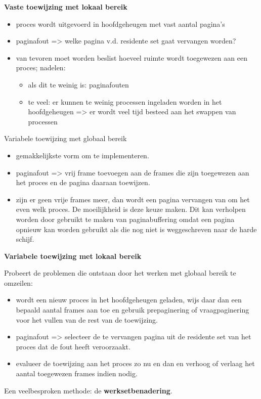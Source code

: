 \textbf{Vaste toewijzing met lokaal bereik}

\begin{itemize}
    \item proces wordt uitgevoerd in hoofdgeheugen met vast aantal pagina's
    \item paginafout => welke pagina v.d. residente set gaat vervangen worden?
    \item van tevoren moet worden beslist hoeveel ruimte wordt toegewezen aan een proces; nadelen:
        \begin{itemize}
        \item als dit te weinig is: paginafouten
        \item te veel: er kunnen te weinig processen ingeladen worden in het hoofdgeheugen => er wordt veel tijd besteed aan het swappen van processen
        \end{itemize}
\end{itemize}

Variabele toewijzing met globaal bereik

\begin{itemize}
\item gemakkelijkste vorm om te implementeren.
\item paginafout => vrij frame toevoegen aan de frames die zijn toegewezen aan het proces en de pagina daaraan toewijzen.
\item zijn er geen vrije frames meer, dan wordt een pagina vervangen van om het even welk proces. De moeilijkheid is deze keuze maken. Dit kan verholpen worden door gebruikt te maken van paginabuffering omdat een pagina opnieuw kan worden gebruikt als die nog niet is weggeschreven naar de harde schijf.
\end{itemize}




\textbf{Variabele toewijzing met lokaal bereik}

Probeert de problemen die ontstaan door het werken met globaal bereik te omzeilen:

\begin{itemize}
\item wordt een nieuw proces in het hoofdgeheugen geladen, wijs daar dan een bepaald aantal frames aan toe en gebruik prepaginering of vraagpaginering voor het vullen van de rest van de toewijzing.
\item paginafout => selecteer de te vervangen pagina uit de residente set van het proces dat de fout heeft veroorzaakt.
\item evalueer de toewijzing aan het proces zo nu en dan en verhoog of verlaag het aantal toegewezen frames indien nodig.
\end{itemize}
Een veelbesproken methode: de \textbf{werksetbenadering}.

